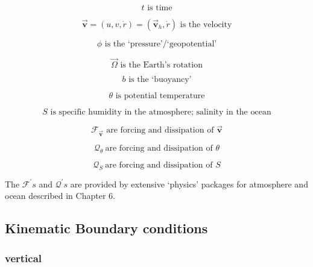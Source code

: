 \documentclass[12pt]{book}
\begin{document}
\begin{equation*}
t\text{ is time}
\end{equation*}

\begin{equation*}
\vec{\mathbf{v}}=(u,v,\dot{r})=(\vec{\mathbf{v}}_{h},\dot{r})\text{ is the
velocity}
\end{equation*}

\begin{equation*}
\phi \text{ is the `pressure'/`geopotential'}
\end{equation*}

\begin{equation*}
\vec{\Omega}\text{ is the Earth's rotation}
\end{equation*}

\begin{equation*}
b\text{ is the `buoyancy'}
\end{equation*}

\begin{equation*}
\theta \text{ is potential temperature}
\end{equation*}

\begin{equation*}
S\text{ is specific humidity in the atmosphere; salinity in the ocean}
\end{equation*}

\begin{equation*}
\mathcal{F}_{\vec{\mathbf{v}}}\text{ are forcing and dissipation of }\vec{
\mathbf{v}}
\end{equation*}

\begin{equation*}
\mathcal{Q}_{\theta }\mathcal{\ }\text{are forcing and dissipation of }\theta
\end{equation*}

\begin{equation*}
\mathcal{Q}_{S}\mathcal{\ }\text{are forcing and dissipation of }S
\end{equation*}

The $\mathcal{F}^{\prime }s$ and $\mathcal{Q}^{\prime }s$ are provided by
extensive `physics' packages for atmosphere and ocean described in Chapter 6.

\subsection{Kinematic Boundary conditions}

\subsubsection{vertical}
\end{document}
